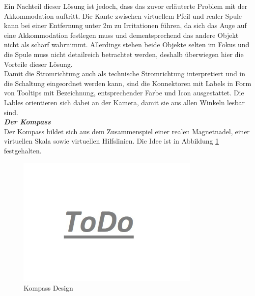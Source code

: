 Ein Nachteil dieser Lösung ist jedoch, dass das zuvor erläuterte Problem mit der Akkommodation auftritt. Die Kante zwischen virtuellem Pfeil und realer Spule kann bei einer Entfernung unter 2m zu Irritationen führen, da sich das Auge auf eine Akkommodation festlegen muss und dementsprechend das andere Objekt nicht als scharf wahrnimmt. Allerdings stehen beide Objekte selten im Fokus und die Spule muss nicht detailreich betrachtet werden, deshalb überwiegen hier die Vorteile dieser Lösung.\\

Damit die Stromrichtung auch als technische Stromrichtung interpretiert und in die Schaltung eingeordnet werden kann, sind die Konnektoren mit Labels in Form von Tooltips mit Bezeichnung, entsprechender Farbe und Icon ausgestattet. Die Lables orientieren sich dabei an der Kamera, damit sie aus allen Winkeln lesbar sind.\\

\textbf{\textit{Der Kompass}}\\
Der Kompass bildet sich aus dem Zusammenspiel einer realen Magnetnadel, einer virtuellen Skala sowie virtuellen Hilfslinien. Die Idee ist in Abbildung \ref{img:compass-design} festgehalten.

\begin{figure}[h!]
	\centering
	\includegraphics[width=0.8\textwidth]{images/todo.jpg}
	\caption{Kompass Design}
	\label{img:compass-design}
\end{figure}

